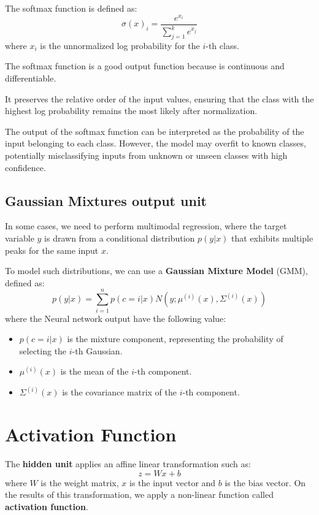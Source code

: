 The softmax function is defined as:
\begin{equation}
    \sigma(x)_i = \frac{e^{x_i}}{\sum_{j=1}^k e^{x_j}}
\end{equation}
where $x_i$ is the unnormalized log probability for the $i$-th class.

The softmax function is a good output function because is continuous and
differentiable.

It preserves the relative order of the input values, ensuring that the class with
the highest log probability remains the most likely after normalization.

The output of the softmax function can be interpreted as the probability of the
input belonging to each class. However, the model may overfit to known classes,
potentially misclassifying inputs from unknown or unseen classes with high confidence.
\subsection{Gaussian Mixtures output unit}
In some cases, we need to perform multimodal regression, where the target variable
$y$ is drawn from a conditional distribution $p(y|x)$ that exhibits multiple peaks
for the same input $x$.

To model such distributions, we can use a \textbf{Gaussian Mixture Model} (GMM),
defined as:
\begin{equation}
    p(y|x) = \sum_{i=1}^n p(c= i|x) N(y; \mu^{(i)}(x), \Sigma^{(i)}(x))
\end{equation}
where the Neural network output have the following value:
\begin{itemize}
    \item $p(c=i|x)$ is the mixture component, representing the probability of
          selecting the $i$-th Gaussian.
    \item $\mu^{(i)}(x)$ is the mean of the $i$-th component.
    \item $\Sigma^{(i)}(x)$ is the covariance matrix of the $i$-th component.
\end{itemize}
\section{Activation Function}
The \textbf{hidden unit} applies an affine linear transformation such as:
\begin{equation}
    z = Wx + b
\end{equation}
where $W$ is the weight matrix, $x$ is the input vector and $b$ is the bias vector.
On the results of this transformation, we apply a non-linear function called
\textbf{activation function}.

